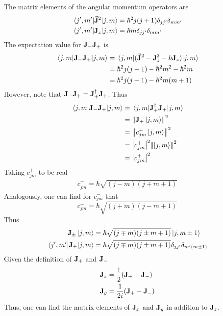 \documentclass[12pt,a4paper,titlepage]{article}
\begin{document}
The matrix elements of the angular momentum operators are
\begin{equation}
\begin{aligned}
\mel{j',m'}{\vec{\vb{J}}^{2}}{j,m}&=\hbar^{2}j(j+1)\delta_{jj'}\delta_{mm'}\\
\mel{j',m'}{\vb{J}_{z}}{j,m}&=\hbar m\delta_{jj'}\delta_{mm'}
\end{aligned}
\end{equation}
The expectation value for $\vb{J}_{-}\vb{J}_{+}$ is
\begin{equation}
\begin{aligned}
\mel{j,m}{\vb{J}_{-}\vb{J}_{+}}{j,m}&=\mel{j,m}{(\vec{\vb{J}}^{2}-\vb{J}_{z}^{2}-\hbar\vb{J}_{z})}{j,m}\\
&=\hbar^{2}j(j+1)-\hbar^{2}m^{2}-\hbar^{2}m\\
&=\hbar^{2}j(j+1)-\hbar^{2}m(m+1)
\end{aligned}
\end{equation}
However, note that $\vb{J}_{-}\vb{J}_{+}=\vb{J}_{+}^{\dagger}\vb{J}_{+}$. Thus
\begin{equation}
\begin{aligned}
\mel{j,m}{\vb{J}_{-}\vb{J}_{+}}{j,m}&=\mel{j,m}{\vb{J}_{+}^{\dagger}\vb{J}_{+}}{j,m}\\
&=\norm{\vb{J}_{+}\ket{j,m}}^{2}\\
&=\norm{c_{jm}^{+}\ket{j,m}}^{2}\\
&=\abs{c_{jm}^{+}}^{2}\norm{\ket{j,m}}^{2}\\
&=\abs{c_{jm}^{+}}^{2}
\end{aligned}
\end{equation}
Taking $c_{jm}^{+}$ to be real
\begin{equation}
\begin{aligned}
c_{jm}^{+}=\hbar\sqrt{(j-m)(j+m+1)}
\end{aligned}
\end{equation}
Analogously, one can find for $c_{jm}^{-}$ that
\begin{equation}
c_{jm}^{-}=\hbar\sqrt{(j+m)(j-m+1)}
\end{equation}
Thus
\begin{equation}
\begin{aligned}
\vb{J}_{\pm}\ket{j,m}&=\hbar\sqrt{(j\mp m)(j\pm m+1)}\ket{j,m\pm1}\\
\mel{j',m'}{\vb{J}_{\pm}}{j,m}&=\hbar\sqrt{(j\mp m)(j\pm m+1)}\delta_{jj'}\delta_{m'(m\pm1)}
\end{aligned}
\end{equation}
Given the definition of $\vb{J}_{+}$ and $\vb{J}_{-}$
\begin{equation}
\begin{aligned}
\vb{J}_{x}&=\frac{1}{2}(\vb{J}_{+}+\vb{J}_{-})\\
\vb{J}_{y}&=\frac{1}{2i}(\vb{J}_{+}-\vb{J}_{-})
\end{aligned}
\end{equation}
Thus, one can find the matrix elements of $\vb{J}_{x}$ and $\vb{J}_{y}$ in addition to $\vb{J}_{z}$.\\
\end{document}
